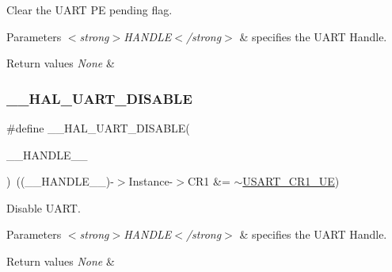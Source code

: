Clear the U\+A\+RT PE pending flag. 


\begin{DoxyParams}{Parameters}
{\em $<$strong$>$\+H\+A\+N\+D\+L\+E$<$/strong$>$} & specifies the U\+A\+RT Handle. \\
\hline
\end{DoxyParams}

\begin{DoxyRetVals}{Return values}
{\em None} & \\
\hline
\end{DoxyRetVals}
\mbox{\label{group___u_a_r_t___exported___macros_gad2f9fbdb4adf3a09939e201eaeea072f}} 
\subsubsection{\texorpdfstring{\_\_HAL\_UART\_DISABLE}{\_\_HAL\_UART\_DISABLE}}
{\footnotesize\ttfamily \#define \+\_\+\+\_\+\+H\+A\+L\+\_\+\+U\+A\+R\+T\+\_\+\+D\+I\+S\+A\+B\+LE(\begin{DoxyParamCaption}\item[{}]{\+\_\+\+\_\+\+H\+A\+N\+D\+L\+E\+\_\+\+\_\+ }\end{DoxyParamCaption})~((\+\_\+\+\_\+\+H\+A\+N\+D\+L\+E\+\_\+\+\_\+)-\/$>$Instance-\/$>$C\+R1 \&= $\sim$\mbox{\hyperlink{group___peripheral___registers___bits___definition_ga2bb650676aaae4a5203f372d497d5947}{U\+S\+A\+R\+T\+\_\+\+C\+R1\+\_\+\+UE}})}



Disable U\+A\+RT. 


\begin{DoxyParams}{Parameters}
{\em $<$strong$>$\+H\+A\+N\+D\+L\+E$<$/strong$>$} & specifies the U\+A\+RT Handle. \\
\hline
\end{DoxyParams}

\begin{DoxyRetVals}{Return values}
{\em None} & \\
\hline
\end{DoxyRetVals}
\mbox{\label{group___u_a_r_t___exported___macros_ga3c29b33f38658acbf592e9aaf84c6f33}} 
